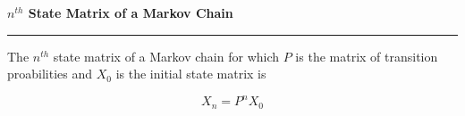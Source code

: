 \nopagenumbers
{\bf $n^{th}$ State Matrix of a Markov Chain}
\vskip 1mm
\hrule

\vskip 6pt
The $n^{th}$ state matrix of a Markov chain for which $P$ is the matrix of transition proabilities and $X_0$ is the initial state matrix is

$$X_n=P^nX_0$$


\vfill\eject
\bye
